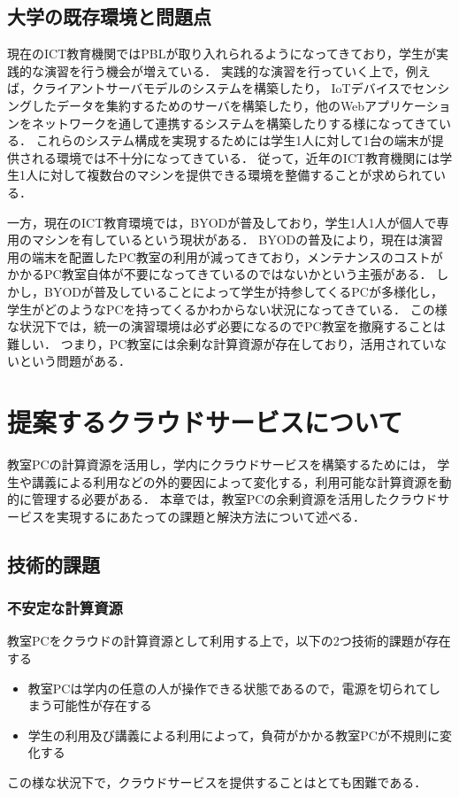 \documentclass[11pt,a4paper]{jsarticle}
\begin{document}
\subsection{大学の既存環境と問題点}
現在のICT教育機関ではPBLが取り入れられるようになってきており，学生が実践的な演習を行う機会が増えている．
実践的な演習を行っていく上で，例えば，クライアントサーバモデルのシステムを構築したり，
IoTデバイスでセンシングしたデータを集約するためのサーバを構築したり，他のWebアプリケーションをネットワークを通して連携するシステムを構築したりする様になってきている．
これらのシステム構成を実現するためには学生1人に対して1台の端末が提供される環境では不十分になってきている．
従って，近年のICT教育機関には学生1人に対して複数台のマシンを提供できる環境を整備することが求められている．
\par 一方，現在のICT教育環境では，BYODが普及しており，学生1人1人が個人で専用のマシンを有しているという現状がある．
BYODの普及により，現在は演習用の端末を配置したPC教室の利用が減ってきており，メンテナンスのコストがかかるPC教室自体が不要になってきているのではないかという主張がある．
しかし，BYODが普及していることによって学生が持参してくるPCが多様化し，学生がどのようなPCを持ってくるかわからない状況になってきている．
この様な状況下では，統一の演習環境は必ず必要になるのでPC教室を撤廃することは難しい．
つまり，PC教室には余剰な計算資源が存在しており，活用されていないという問題がある．

\section{提案するクラウドサービスについて}
教室PCの計算資源を活用し，学内にクラウドサービスを構築するためには，
学生や講義による利用などの外的要因によって変化する，利用可能な計算資源を動的に管理する必要がある．
本章では，教室PCの余剰資源を活用したクラウドサービスを実現するにあたっての課題と解決方法について述べる．
\subsection{技術的課題}
\subsubsection{不安定な計算資源}
教室PCをクラウドの計算資源として利用する上で，以下の2つ技術的課題が存在する
\begin{itemize}
	\item 教室PCは学内の任意の人が操作できる状態であるので，電源を切られてしまう可能性が存在する
	\item 学生の利用及び講義による利用によって，負荷がかかる教室PCが不規則に変化する
\end{itemize}
この様な状況下で，クラウドサービスを提供することはとても困難である．
\end{document}

